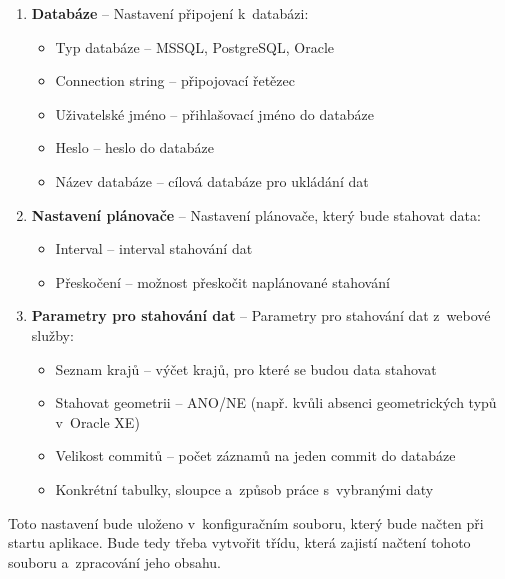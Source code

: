 \begin{enumerate}
    \item \textbf{Databáze} -- Nastavení připojení k~databázi:
    \begin{itemize}
        \item Typ databáze -- MSSQL, PostgreSQL, Oracle
        \item Connection string -- připojovací řetězec
        \item Uživatelské jméno -- přihlašovací jméno do databáze
        \item Heslo -- heslo do databáze
        \item Název databáze -- cílová databáze pro ukládání dat
    \end{itemize}

    \item \textbf{Nastavení plánovače} -- Nastavení plánovače, který bude stahovat data:
    \begin{itemize}
        \item Interval -- interval stahování dat
        \item Přeskočení -- možnost přeskočit naplánované stahování
    \end{itemize}
    
    \item \textbf{Parametry pro stahování dat} -- Parametry pro stahování dat z~webové služby:
    \begin{itemize}
        \item Seznam krajů -- výčet krajů, pro které se budou data stahovat
        \item Stahovat geometrii -- ANO/NE (např. kvůli absenci geometrických typů v~Oracle XE)
        \item Velikost commitů -- počet záznamů na jeden commit do databáze
        \item Konkrétní tabulky, sloupce a~způsob práce s~vybranými daty
    \end{itemize}
\end{enumerate}

Toto nastavení bude uloženo v~konfiguračním souboru, který bude načten při startu aplikace.
Bude tedy třeba vytvořit třídu, která zajistí načtení tohoto souboru a~zpracování jeho obsahu.